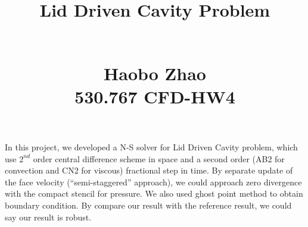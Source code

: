 \documentclass[12pt]{article}
\begin{document}
\title{\begin{Huge}Lid Driven Cavity Problem\end{Huge}\\Haobo Zhao\\530.767 CFD-HW4}
\maketitle

In this project, we developed a N-S solver for Lid Driven Cavity problem, which use $2^{nd}$ order central difference scheme in space and a second order (AB2 for convection and CN2 for viscous) fractional step in time. By separate update of the face velocity (“semi-staggered”  approach), we could approach zero divergence with the compact stencil for pressure. We also used ghost point method to obtain boundary condition. By compare our result with the reference result, we could say our result is robust.








\tableofcontents





\end{document}
